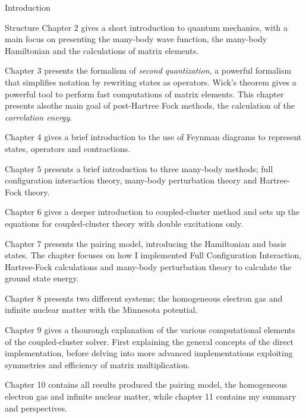 \documentclass[twoside,english]{uiofysmaster}
\begin{document}
\begin{chapter}{Introduction}
\begin{subsection}{Structure}
		Chapter 2 gives a short introduction to quantum mechanics, with a main focus on presenting the many-body wave function, the many-body Hamiltonian and the calculations of matrix elements. 

		Chapter 3 presents the formalism of \textit{second quantization}, a powerful formalism that simplifies notation by rewriting states as operators. Wick's theorem gives a powerful tool to perform fast computations of matrix elements. This chapter presents alsothe main goal of post-Hartree Fock methods, the calculation of the \textit{correlation energy}. 

		Chapter 4 gives a brief introduction to the use of Feynman diagrams to represent states, operators and contractions.

		Chapter 5 presents a brief introduction to three many-body methods; full configuration interaction theory, many-body perturbation theory and Hartree-Fock theory. 

		Chapter 6 gives a deeper introduction to coupled-cluster method and sets up the equations for coupled-cluster theory with double excitations only. 

		Chapter 7 presents the pairing model, introducing the Hamiltonian and basis states. The chapter focuses on how I implemented Full Configuration Interaction, Hartree-Fock calculations and many-body perturbation theory to calculate the ground state energy. 

		Chapter 8 presents two different systems; the homogeneous electron gas and infinite nuclear matter with the Minnesota potential. 

		Chapter 9 gives a thourough explanation of the various computational elements of the coupled-cluster solver. First explaining the general concepts of the direct implementation, before delving into more advanced implementations exploiting symmetries and efficiency of matrix multiplication. 

		Chapter 10 contains all results produced the pairing model, the homogeneous electron gas and infinite nuclear matter, while chapter 11 contains my summary and perspectives. 
	\end{subsection}
\end{chapter}
\end{document}
